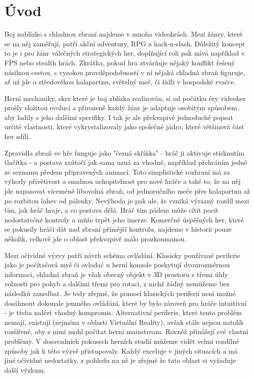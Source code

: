 \chapter*{Úvod}

Boj nablízko s chladnou zbraní najdeme v mnoha videohrách. Mezi žánry, které se na něj zaměřují, patří akční adventury, RPG a hack-n-slash. Důležitý koncept to je i pro žánr válečných strategických her, doplňující roli pak mívá například v FPS nebo stealth hrách. Zkrátka, pokud hra ztvárňuje nějaký konflikt řešený násilnou cestou, s vysokou pravděpodobností v ní nějaká chladná zbraň figuruje, ať už jde o středověkou halapartnu, světelný meč, či židli v hospodské rvačce.

Herní mechaniky, skrz které je boj zblízka realizován, si od počátku éry videoher prošly složitou evolucí a přirozeně každý žánr je adaptuje osobitým způsobem, aby ladily s jeho dalšími specifiky. I tak je ale překvapivě jednoduché popsat určité vlastnosti, které vykrystalizovaly jako společné jádro, které většinová část her sdílí.

Zpravidla zbraň ve hře funguje jako "černá skříňka" - hráč ji aktivuje stisknutím tlačítka - a postava zaútočí jak sama uzná za vhodné, například přehráním jedné ze seznamu předem připravených animací. Toto simplistické rozhraní má za výhody přívětivost a snadnou uchopitelnost pro nové hráče a také to, že na něj jde napasovat víceméně libovolná zbraň, od jednoručního meče přes halapartnu až po rozbitou lahev od pálenky. Nevýhoda je pak ale, že vzniká výrazný rozdíl mezi tím, jak hráč hraje, a co postava dělá. Hráč tím pádem může cítit pocit nedostatečné kontroly a může trpět jeho imerze. Komerčně úspěšných her, které se pokusily hráči dát nad zbraní přímější kontrolu, najdeme v historii pouze několik, celkově jde o oblast překvapivě málo prozkoumanou. 
  
Mezi očividné výzvy patří návrh schéma ovládání.  Klasicky používané periferie jako je počítačová myš či ovladač u herní konzole poskytují dvourozměrnou informaci, chladná zbraň je však obecný objekt v 3D prostoru s třemi úhly volnosti pro pohyb a dalšími třemi pro rotaci, z nichž žádný nemůžeme bez následků zanedbat. Je tedy zřejmé, že pomocí klasických periferií není možné dosáhnout dokonale jemného ovládání, které by bylo zároveň pro hráče intuitivní - je třeba nalézt vhodný kompromis. Alternativní periferie, které tento problém nemají, existují (zejména v oblasti Virtuální Reality), avšak stále nejsou natolik rozšířené, aby s nimi mohl počítat herní mainstream. Rovněž přinášejí své vlastní problémy. V dosavadních pokusech herních studií můžeme vidět velmi rozdílné způsoby jak k této výzvě přistupovaly. Každý exceluje v jiných situacích a má jiné očividné nedostatky, z pohledu na ně je zřejmé že tato oblast si vyžaduje další výzkum. 
 

